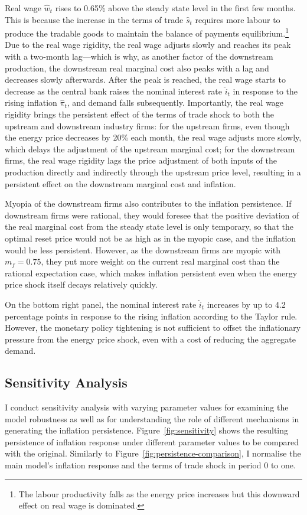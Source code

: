 \documentclass[a4paper, 12pt]{article}
\theoremstyle{definition*}
\begin{document}
Real wage $\hat w_t$ rises to 0.65\% above the steady state level in the first few months.
This is because the increase in the terms of trade $\hat s_t$ requires more labour to produce the tradable goods to maintain the balance of payments equilibrium.\footnote{The labour productivity falls as the energy price increases but this downward effect on real wage is dominated.}
Due to the real wage rigidity, the real wage adjusts slowly and reaches its peak with a two-month lag---which is why, as another factor of the downstream production, the downstream real marginal cost also peaks with a lag and decreases slowly afterwards.
After the peak is reached, the real wage starts to decrease as the central bank raises the nominal interest rate $\hat i_t$ in response to the rising inflation $\hat \pi_t$, and demand falls subsequently.
Importantly, the real wage rigidity brings the persistent effect of the terms of trade shock to both the upstream and downstream industry firms: for the upstream firms, even though the energy price decreases by 20\% each month, the real wage adjusts more slowly, which delays the adjustment of the upstream marginal cost; for the downstream firms, the real wage rigidity lags the price adjustment of both inputs of the production directly and indirectly through the upstream price level, resulting in a persistent effect on the downstream marginal cost and inflation.

Myopia of the downstream firms also contributes to the inflation persistence.
If downstream firms were rational, they would foresee that the positive deviation of the real marginal cost from the steady state level is only temporary, so that the optimal reset price would not be as high as in the myopic case, and the inflation would be less persistent.
However, as the downstream firms are myopic with $m_f = 0.75$, they put more weight on the current real marginal cost than the rational expectation case, which makes inflation persistent even when the energy price shock itself decays relatively quickly.

On the bottom right panel, the nominal interest rate $\hat i_t$ increases by up to 4.2 percentage points in response to the rising inflation according to the Taylor rule.
However, the monetary policy tightening is not sufficient to offset the inflationary pressure from the energy price shock, even with a cost of reducing the aggregate demand.

\subsection{Sensitivity Analysis}\label{subsec:sensitivity_analysis}
I conduct sensitivity analysis with varying parameter values for examining the model robustness as well as for understanding the role of different mechanisms in generating the inflation persistence.
Figure~\ref{fig:sensitivity} shows the resulting persistence of inflation response under different parameter values to be compared with the original.
Similarly to Figure~\ref{fig:persistence-comparison}, I normalise the main model's inflation response and the terms of trade shock in period 0 to one.
\end{document}
